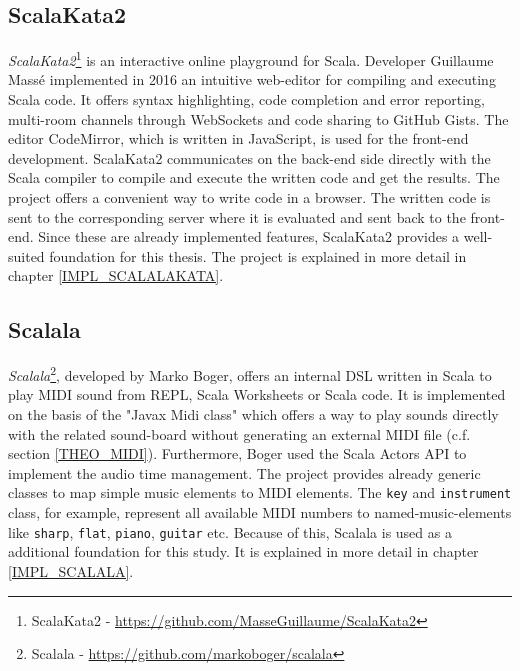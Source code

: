 \subsection{ScalaKata2}
\label{LIT_PROJ_SCALAKATA2}
\textit{ScalaKata2}\footnote{ScalaKata2 - \url{https://github.com/MasseGuillaume/ScalaKata2}} is an interactive online playground for Scala. Developer Guillaume Massé implemented in 2016 an intuitive web-editor for compiling and executing Scala code. It offers syntax highlighting, code completion and error reporting, multi-room channels through WebSockets and code sharing to GitHub Gists. The editor CodeMirror, which is written in JavaScript, is used for the front-end development. ScalaKata2 communicates on the back-end side directly with the Scala compiler to compile and execute the written code and get the results. The project offers a convenient way to write code in a browser. The written code is sent to the corresponding server where it is evaluated and sent back to the front-end. Since these are already implemented features, ScalaKata2 provides a well-suited foundation for this thesis. The project is explained in more detail in chapter \ref{IMPL_SCALALAKATA}.

\subsection{Scalala}
\label{LIT_PROJ_SCALALA}
\textit{Scalala}\footnote{Scalala - \url{https://github.com/markoboger/scalala}}, developed by Marko Boger, offers an internal DSL written in Scala to play MIDI sound from REPL, Scala Worksheets or Scala code. It is implemented on the basis of the "Javax Midi class" which offers a way to play sounds directly with the related sound-board without generating an external MIDI file (c.f. section \ref{THEO_MIDI}). Furthermore, Boger used the Scala Actors API to implement the audio time management. The project provides already generic classes to map simple music elements to MIDI elements. The \texttt{key} and \texttt{instrument} class, for example, represent all available MIDI numbers to named-music-elements like \texttt{sharp}, \texttt{flat}, \texttt{piano}, \texttt{guitar} etc. Because of this, Scalala is used as a additional foundation for this study. It is explained in more detail in chapter \ref{IMPL_SCALALA}. 













